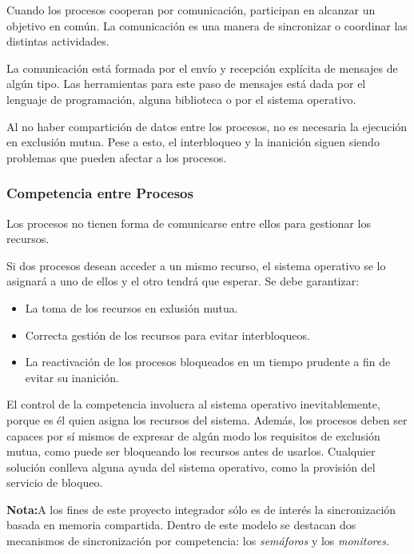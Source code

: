 Cuando los procesos cooperan por comunicación, participan en alcanzar un
objetivo en común. La comunicación es una manera de sincronizar o coordinar las
distintas actividades.

La comunicación está formada por el envío y recepción explícita de mensajes de
algún tipo. Las herramientas para este paso de mensajes está dada por el
lenguaje de programación, alguna biblioteca o por el sistema operativo.

Al no haber compartición de datos entre los procesos, no es necesaria la
ejecución en exclusión mutua. Pese a esto, el interbloqueo y la inanición siguen
siendo problemas que pueden afectar a los procesos.\cite{SistOpStallings}

\subsubsection{Competencia entre Procesos}

Los procesos no tienen forma de comunicarse entre ellos para gestionar los
recursos.

Si dos procesos desean acceder a un mismo recurso, el sistema operativo se lo
asignará a uno de ellos y el otro tendrá que esperar. Se debe garantizar:
\begin{itemize}
    \item La toma de los recursos en exlusión mutua.
    \item Correcta gestión de los recursos para evitar interbloqueos.
    \item La reactivación de los procesos bloqueados en un tiempo prudente a fin de evitar su inanición.
\end{itemize}
El control de la competencia involucra al sistema operativo
inevitablemente, porque es él quien asigna los recursos del sistema.
Además, los procesos deben ser capaces por sí mismos de expresar de algún
modo los requisitos de exclusión mutua, como puede ser bloqueando los
recursos antes de usarlos. Cualquier solución conlleva alguna ayuda del
sistema operativo, como la provisión del servicio de
bloqueo.\cite{SistOpStallings}

\begin{framed}
\textbf{Nota:}A los fines de este proyecto integrador sólo es de interés la
sincronización basada en memoria compartida. Dentro de este modelo se destacan dos mecanismos
de sincronización por competencia: los \textit{semáforos} y los \textit{monitores}.
\end{framed}

